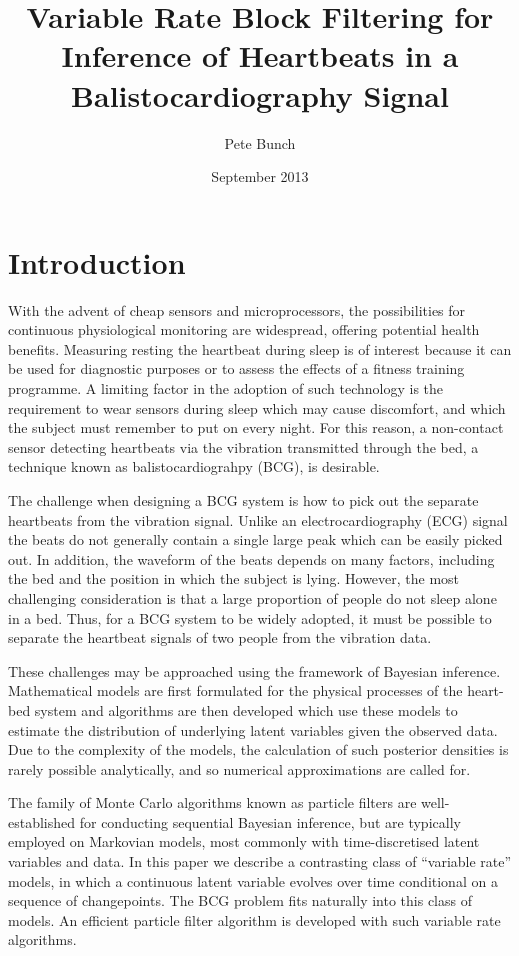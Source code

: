 \documentclass{article}
\title{Variable Rate Block Filtering for Inference of Heartbeats in a Balistocardiography Signal}
\author{Pete Bunch}
\date{September 2013}
\begin{document}
\maketitle

\section{Introduction}

With the advent of cheap sensors and microprocessors, the possibilities for continuous physiological monitoring are widespread, offering potential health benefits. Measuring resting the heartbeat during sleep is of interest because it can be used for diagnostic purposes or to assess the effects of a fitness training programme. A limiting factor in the adoption of such technology is the requirement to wear sensors during sleep which may cause discomfort, and which the subject must remember to put on every night. For this reason, a non-contact sensor detecting heartbeats via the vibration transmitted through the bed, a technique known as balistocardiograhpy (BCG), is desirable.

The challenge when designing a BCG system is how to pick out the separate heartbeats from the vibration signal. Unlike an electrocardiography (ECG) signal the beats do not generally contain a single large peak which can be easily picked out. In addition, the waveform of the beats depends on many factors, including the bed and the position in which the subject is lying. However, the most challenging consideration is that a large proportion of people do not sleep alone in a bed. Thus, for a BCG system to be widely adopted, it must be possible to separate the heartbeat signals of two people from the vibration data.

These challenges may be approached using the framework of Bayesian inference. Mathematical models are first formulated for the physical processes of the heart-bed system and algorithms are then developed which use these models to estimate the distribution of underlying latent variables given the observed data. Due to the complexity of the models, the calculation of such posterior densities is rarely possible analytically, and so numerical approximations are called for.

The family of Monte Carlo algorithms known as particle filters are well-established for conducting sequential Bayesian inference, but are typically employed on Markovian models, most commonly with time-discretised latent variables and data. In this paper we describe a contrasting class of ``variable rate'' models, in which a continuous latent variable evolves over time conditional on a sequence of changepoints. The BCG problem fits naturally into this class of models. An efficient particle filter algorithm is developed with such variable rate algorithms.
\end{document}
